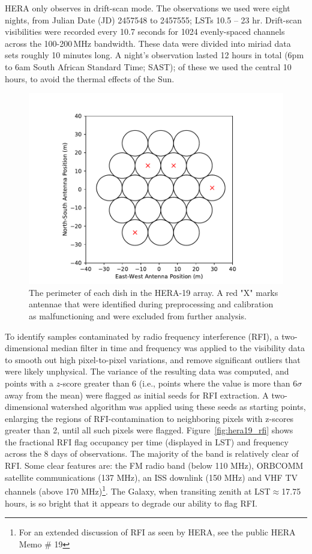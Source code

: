HERA only observes in drift-scan mode. The observations we used were eight nights, from Julian Date (JD) 2457548 to 2457555; LSTs 10.5 -- 23 hr. Drift-scan visibilities were recorded every 10.7 seconds for 1024 evenly-spaced channels across the 100-200\,MHz bandwidth. These data were divided into {\sc miriad} data sets roughly 10 minutes long. A night's observation lasted 12 hours in total (6pm to 6am South African Standard Time; SAST); of these we used the central 10 hours, to avoid the thermal effects of the Sun.

\begin{figure}
\centering
\hspace{-0.5cm}\includegraphics[scale=0.6]{chapters/eor_window_HERA/figures/antpos_hera19.pdf}
\caption[The perimeter of each dish in the HERA-19 array.]{The perimeter of each dish in the HERA-19 array.  A red "X" marks antennae that were identified during preprocessing and calibration as malfunctioning and were excluded from further analysis.}
\label{fig:hera19_antpos}
\end{figure}

To identify samples contaminated by radio frequency interference (RFI), a two-dimensional median filter in time and frequency was applied to the visibility data to smooth out high pixel-to-pixel variations, and remove significant outliers that were likely unphysical. The variance of the resulting data was computed, and points with a $z$-score greater than 6 (i.e., points where the value is more than 6$\sigma$ away from the mean) were flagged as initial seeds for RFI extraction. A two-dimensional watershed algorithm was applied using these seeds as starting points, enlarging the regions of RFI-contamination to neighboring pixels with z-scores greater than 2, until all such pixels were flagged. Figure~\ref{fig:hera19_rfi} shows the fractional RFI flag occupancy per time (displayed in LST) and frequency across the 8 days of observations. The majority of the band is relatively clear of RFI. Some clear features are: the FM radio band (below 110 MHz), ORBCOMM satellite communications (137 MHz), an ISS downlink (150 MHz) and VHF TV channels (above 170 MHz)\footnote{For an extended discussion of RFI as seen by HERA, see the public HERA Memo \# 19}.
The Galaxy, when transiting zenith at LST$\approx$17.75 hours, is so bright that it appears to degrade our ability to flag RFI.

